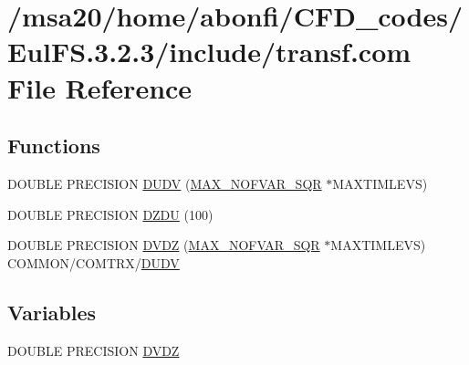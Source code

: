 \hypertarget{msa20_2home_2abonfi_2_c_f_d__codes_2_eul_f_s_83_82_83_2include_2transf_8com}{\section{/msa20/home/abonfi/\-C\-F\-D\-\_\-codes/\-Eul\-F\-S.3.2.3/include/transf.com File Reference}
\label{msa20_2home_2abonfi_2_c_f_d__codes_2_eul_f_s_83_82_83_2include_2transf_8com}
}
\subsection*{Functions}
\begin{DoxyCompactItemize}
\item 
D\-O\-U\-B\-L\-E P\-R\-E\-C\-I\-S\-I\-O\-N \hyperlink{msa20_2home_2abonfi_2_c_f_d__codes_2_eul_f_s_83_82_83_2include_2transf_8com_a8e878d3244ead9471a3061a190818761}{D\-U\-D\-V} (\hyperlink{msa20_2home_2abonfi_2_c_f_d__codes_2_eul_f_s_83_82_83_2include_2paramt_8h_a7655047f32c8c333f5412ebb47ac3e25}{M\-A\-X\-\_\-\-N\-O\-F\-V\-A\-R\-\_\-\-S\-Q\-R} $\ast$M\-A\-X\-T\-I\-M\-L\-E\-V\-S)
\item 
D\-O\-U\-B\-L\-E P\-R\-E\-C\-I\-S\-I\-O\-N \hyperlink{msa20_2home_2abonfi_2_c_f_d__codes_2_eul_f_s_83_82_83_2include_2transf_8com_ae784d1e46a7cf6121731aaf108825b92}{D\-Z\-D\-U} (100)
\item 
D\-O\-U\-B\-L\-E P\-R\-E\-C\-I\-S\-I\-O\-N \hyperlink{msa20_2home_2abonfi_2_c_f_d__codes_2_eul_f_s_83_82_83_2include_2transf_8com_a9e0bfeb32fc4aec64d9cbee966142e0f}{D\-V\-D\-Z} (\hyperlink{msa20_2home_2abonfi_2_c_f_d__codes_2_eul_f_s_83_82_83_2include_2paramt_8h_a7655047f32c8c333f5412ebb47ac3e25}{M\-A\-X\-\_\-\-N\-O\-F\-V\-A\-R\-\_\-\-S\-Q\-R} $\ast$M\-A\-X\-T\-I\-M\-L\-E\-V\-S) C\-O\-M\-M\-O\-N/C\-O\-M\-T\-R\-X/\hyperlink{msa20_2home_2abonfi_2_c_f_d__codes_2_eul_f_s_83_82_83_2include_2transf_8com_a8e878d3244ead9471a3061a190818761}{D\-U\-D\-V}
\end{DoxyCompactItemize}
\subsection*{Variables}
\begin{DoxyCompactItemize}
\item 
D\-O\-U\-B\-L\-E P\-R\-E\-C\-I\-S\-I\-O\-N \hyperlink{msa20_2home_2abonfi_2_c_f_d__codes_2_eul_f_s_83_82_83_2include_2transf_8com_a429c5f2318702f4852a08f2d450c8a69}{D\-V\-D\-Z}
\end{DoxyCompactItemize}


